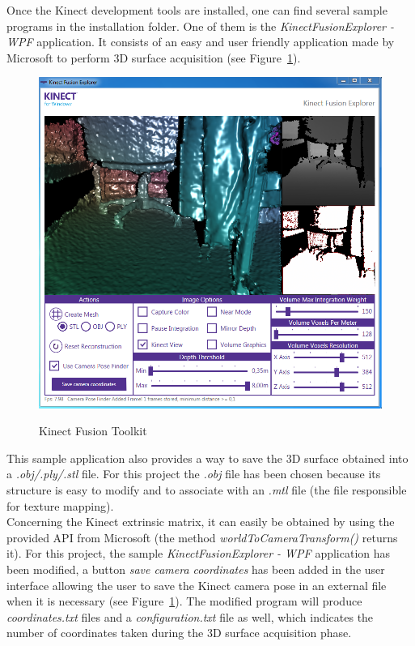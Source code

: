 Once the Kinect development tools are installed, one can find several sample programs in the installation folder. One of them is the \textit{KinectFusionExplorer - WPF} application. It consists of an easy and user friendly application made by Microsoft to perform 3D surface acquisition (see Figure~\ref{fig:Kinect Fusion Toolkit}).\\ 

\begin{figure}
\caption{Kinect Fusion Toolkit}
\centering
    \includegraphics[width=1.0\textwidth]{images/kinectApplication.png}
\label{fig:Kinect Fusion Toolkit}
\end{figure}

This sample application also provides a way to save the 3D surface obtained into a \textit{.obj/.ply/.stl} file. For this project the \textit{.obj} file has been chosen because its structure is easy to modify and to associate with an \textit{.mtl} file (the file responsible for texture mapping).\\

Concerning the Kinect extrinsic matrix, it can easily be obtained by using the provided API from Microsoft (the method \textit{worldToCameraTransform()} returns it). For this project, the sample \textit{KinectFusionExplorer - WPF} application has been modified, a button \textit{save camera coordinates} has been added in the user interface allowing the user to save the Kinect camera pose in an external file when it is necessary (see Figure~\ref{fig:Kinect Fusion Toolkit}). The modified program will produce \textit{coordinates.txt} files and a \textit{configuration.txt} file as well, which indicates the number of coordinates taken during the 3D surface acquisition phase.\\

